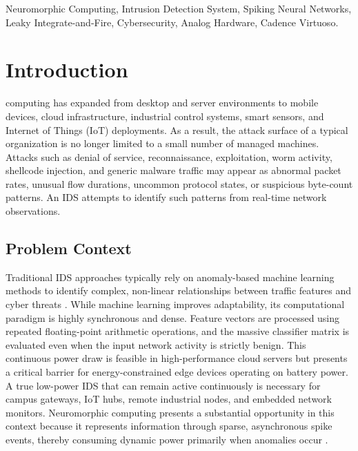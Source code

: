 \documentclass{ieeeaccess}
\begin{document}
\begin{keywords}
Neuromorphic Computing, Intrusion Detection System, Spiking Neural Networks, Leaky Integrate-and-Fire, Cybersecurity, Analog Hardware, Cadence Virtuoso.
\end{keywords}

\maketitle


\section{Introduction}
 computing has expanded from desktop and server environments to mobile devices, cloud infrastructure, industrial control systems, smart sensors, and Internet of Things (IoT) deployments. As a result, the attack surface of a typical organization is no longer limited to a small number of managed machines. Attacks such as denial of service, reconnaissance, exploitation, worm activity, shellcode injection, and generic malware traffic may appear as abnormal packet rates, unusual flow durations, uncommon protocol states, or suspicious byte-count patterns. An IDS attempts to identify such patterns from real-time network observations.

\subsection{Problem Context}
Traditional IDS approaches typically rely on anomaly-based machine learning methods to identify complex, non-linear relationships between traffic features and cyber threats \cite{Buczak2016}. While machine learning improves adaptability, its computational paradigm is highly synchronous and dense. Feature vectors are processed using repeated floating-point arithmetic operations, and the massive classifier matrix is evaluated even when the input network activity is strictly benign. This continuous power draw is feasible in high-performance cloud servers but presents a critical barrier for energy-constrained edge devices operating on battery power. A true low-power IDS that can remain active continuously is necessary for campus gateways, IoT hubs, remote industrial nodes, and embedded network monitors. Neuromorphic computing presents a substantial opportunity in this context because it represents information through sparse, asynchronous spike events, thereby consuming dynamic power primarily when anomalies occur \cite{Roy2019}.
\end{document}
